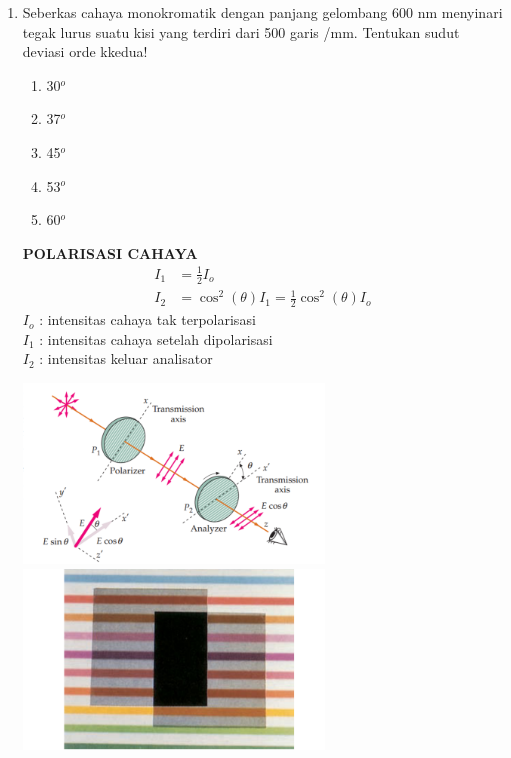 \documentclass[11pt,a4paper]{extarticle}
\newcommand{\pilgani}[1]{                            \vspace{-0.3cm}\begin{multicols}{2}
 \begin{enumerate}[label=\Alph*., itemsep=0pt,topsep=0pt,leftmargin=*,align=Center]#1                     \end{enumerate}
 \phantom{ini cuma sapi, wedus, dan ayam}
 \end{multicols}}
\begin{document}
\begin{multicols*}{2}
\begin{enumerate}
\item Seberkas cahaya monokromatik dengan panjang gelombang 600 nm menyinari tegak lurus suatu kisi yang terdiri dari 500 garis /mm. Tentukan sudut deviasi orde kkedua!  \pilgani{ \item 30$^o$
        \item 37$^o$
        \item 45$^o$
        \item 53$^o$
        \item 60$^o$
        }

\vspace{2cm}






\textbf{POLARISASI CAHAYA}\\
\begin{align*}
 I_1 &= \frac{1}{2} I_o\\
I_2 &= \cos^2 (\theta) I_1 = \frac{1}{2}\cos^2(\theta) I_o
\end{align*}
$I_o$ : intensitas cahaya tak terpolarisasi\\
$I_1$ : intensitas cahaya setelah dipolarisasi\\
$I_2$ : intensitas keluar analisator 

\includegraphics[width=8cm]{pic/polarisasi}
\includegraphics[width=8cm]{pic/polarisasi2}


\end{enumerate}
\end{multicols*}
\end{document}
